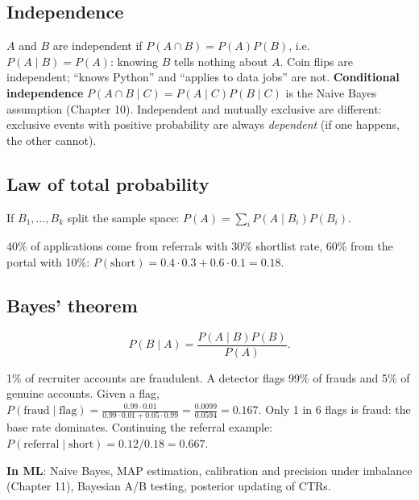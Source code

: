 \subsection{Independence}
$A$ and $B$ are independent if $P(A\cap B) = P(A)P(B)$, i.e. $P(A\mid B) = P(A)$: knowing $B$ tells nothing about $A$. Coin flips are independent; ``knows Python'' and
``applies to data jobs'' are not. \textbf{Conditional independence} $P(A\cap B\mid C) = P(A\mid C)P(B\mid C)$ is the Naive Bayes assumption (Chapter 10). Independent and
mutually exclusive are different: exclusive events with positive probability are always \emph{dependent} (if one happens, the other cannot).

\subsection{Law of total probability}
If $B_1,\dots,B_k$ split the sample space: $P(A) = \sum_iP(A\mid B_i)P(B_i)$.
\begin{example}
40\% of applications come from referrals with 30\% shortlist rate, 60\% from the portal with 10\%: $P(\text{short}) = 0.4\cdot0.3 + 0.6\cdot0.1 = 0.18$.
\end{example}

\subsection{Bayes' theorem}
\[ P(B\mid A) = \frac{P(A\mid B)P(B)}{P(A)}. \]
\begin{example}
1\% of recruiter accounts are fraudulent. A detector flags 99\% of frauds and 5\% of genuine accounts. Given a flag, $P(\text{fraud}\mid\text{flag}) =
\frac{0.99\cdot0.01}{0.99\cdot0.01 + 0.05\cdot0.99} = \frac{0.0099}{0.0594} = 0.167$. Only 1 in 6 flags is fraud: the base rate dominates.
Continuing the referral example: $P(\text{referral}\mid\text{short}) = 0.12/0.18 = 0.667$.
\end{example}
\textbf{In ML}: Naive Bayes, MAP estimation, calibration and precision under imbalance (Chapter 11), Bayesian A/B testing, posterior updating of CTRs.

